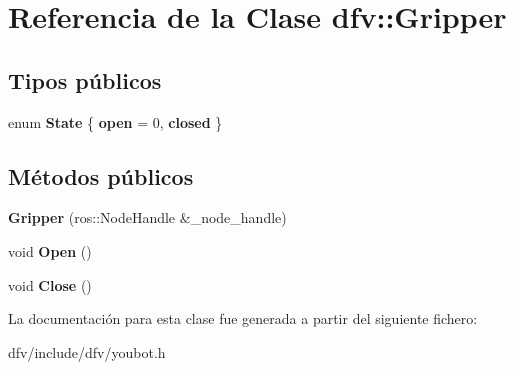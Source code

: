 \hypertarget{classdfv_1_1Gripper}{\section{\-Referencia de la \-Clase dfv\-:\-:\-Gripper}
\label{classdfv_1_1Gripper}
}
\subsection*{\-Tipos públicos}
\begin{DoxyCompactItemize}
\item 
enum {\bfseries \-State} \{ {\bfseries open} =  0, 
{\bfseries closed}
 \}
\end{DoxyCompactItemize}
\subsection*{\-Métodos públicos}
\begin{DoxyCompactItemize}
\item 
\hypertarget{classdfv_1_1Gripper_a332cae0d0403c28abbc6ebbbe23d9c09}{{\bfseries \-Gripper} (ros\-::\-Node\-Handle \&\-\_\-node\-\_\-handle)}\label{classdfv_1_1Gripper_a332cae0d0403c28abbc6ebbbe23d9c09}

\item 
\hypertarget{classdfv_1_1Gripper_a113420d6e814f142851ba071b70c067d}{void {\bfseries \-Open} ()}\label{classdfv_1_1Gripper_a113420d6e814f142851ba071b70c067d}

\item 
\hypertarget{classdfv_1_1Gripper_a0c552cd2c919e72997aa559ccc511242}{void {\bfseries \-Close} ()}\label{classdfv_1_1Gripper_a0c552cd2c919e72997aa559ccc511242}

\end{DoxyCompactItemize}


\-La documentación para esta clase fue generada a partir del siguiente fichero\-:\begin{DoxyCompactItemize}
\item 
dfv/include/dfv/youbot.\-h\end{DoxyCompactItemize}
